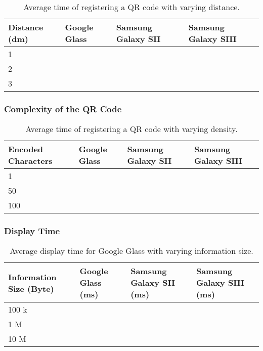 	\begin{table}[ht!]
    		\caption{Average time of registering a QR code with varying distance.} \label{tab:distanceAverage}
		\centering \begin{tabularx}{\textwidth}{l|X|X|X} \hline
		\textbf{Distance (dm)} & \textbf{Google Glass} & \textbf{Samsung Galaxy SII} & \textbf{Samsung Galaxy SIII} \\ \hline \hline
       
		1	&	&	&	\\ \hline
		2	&	&	&	\\ \hline
		3	&	&	&	\\ \hline
		
		\end{tabularx}
	\end{table}

\subsubsection{Complexity of the QR Code}

	\begin{table}[H]%
    		\caption{Average time of registering a QR code with varying density.} \label{tab:complexityAverage}
		\centering \begin{tabularx}{\textwidth}{l|X|X|X} \hline
		\textbf{Encoded Characters} & \textbf{Google Glass} & \textbf{Samsung Galaxy SII} & \textbf{Samsung Galaxy SIII} \\ \hline \hline
       
		1	&	&	&	\\ \hline
		50	&	&	&	\\ \hline
		100	&	&	&	\\ \hline
		
		\end{tabularx}
	\end{table}

\subsubsection{Display Time}

	\begin{table}[ht!]
    		\caption{Average display time for Google Glass with varying information size.} \label{tab:averageDisplaySpeedGoogleGlass}
		\centering \begin{tabularx}{\textwidth}{l|X|X|X} \hline
		\textbf{Information Size (Byte)} & \textbf{Google Glass (ms)}  & \textbf{Samsung Galaxy SII (ms)}  & \textbf{Samsung Galaxy SIII (ms)} \\ \hline \hline
       
		100 k	&	&	&	 \\ \hline
		1 M		&	&	&	 \\ \hline
		10 M		&	&	&	 \\ \hline

		\end{tabularx}
	\end{table}